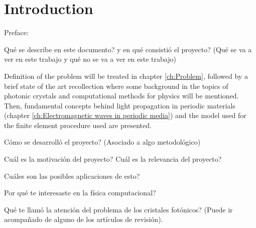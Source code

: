\chapter{Introduction}

Preface:


Qu\'e se describe en este documento? y en qu\'e consisti\'o el proyecto? (Qu\'e se va a ver en este trabajo y qu\'e no se va a ver en este trabajo)


Definition of the problem will be treated in chapter \ref{ch:Problem}, followed by a brief state of the art recollection where some background in the topics of photonic crystals and computational methods for physics will be mentioned. Then, fundamental concepts behind light propagation in periodic materials (chapter \ref{ch:Electromagnetic waves in periodic media})  and the model used for the finite element procedure used are presented.

C\'omo se desarroll\'o el proyecto? (Asociado a algo metodol\'ogico)

Cu\'al es la motivaci\'on del proyecto? Cu\'al es la relevancia del proyecto?

Cu\'ales son las posibles aplicaciones de esto?

Por qu\'e te interesaste en la f\'isica computacional?

Qu\'e te llam\'o la atenci\'on del problema de los cristales fot\'onicos? (Puede ir acompa\~nado de alguno de los art\'iculos de revisi\'on).



